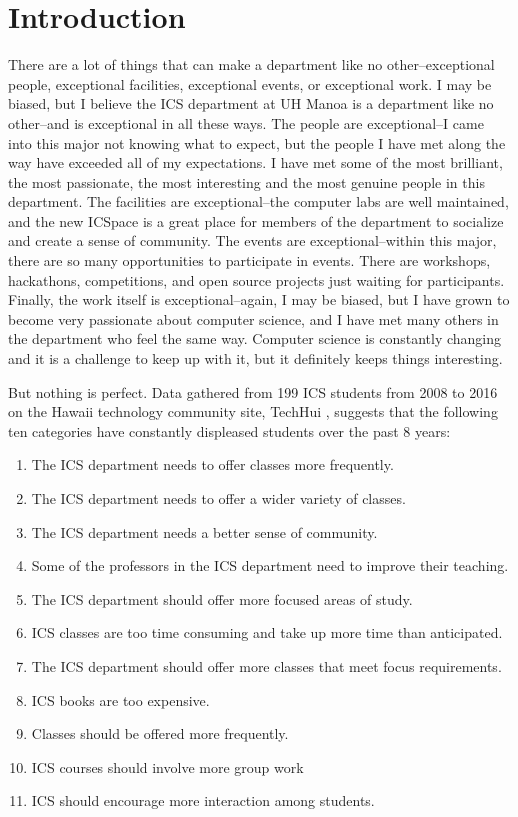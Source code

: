 \chapter{Introduction}
There are a lot of things that can make a department like no other--exceptional people, exceptional facilities, exceptional events, or exceptional work. I may be biased, but I believe the ICS department at UH Manoa is a department like no other--and is exceptional in all these ways. The people are exceptional--I came into this major not knowing what to expect, but the people I have met along the way have exceeded all of my expectations. I have met some of the most brilliant, the most passionate, the most interesting and the most genuine people in this department. The facilities are exceptional--the computer labs are well maintained, and the new ICSpace is a great place for members of the department to socialize and create a sense of community. The events are exceptional--within this major, there are so many opportunities to participate in events. There are workshops, hackathons, competitions, and open source projects just waiting for participants. Finally, the work itself is exceptional--again, I may be biased, but I have grown to become very passionate about computer science, and I have met many others in the department who feel the same way. Computer science is constantly changing and it is a challenge to keep up with it, but it definitely keeps things interesting.

But nothing is perfect. Data gathered from 199 ICS students from 2008 to 2016 on the Hawaii technology community site, TechHui \cite {TechHuiQuestions}, suggests that the following ten categories have constantly displeased students over the past 8 years:

\begin{enumerate}
  \item The ICS department needs to offer classes more frequently.
  \item The ICS department needs to offer a wider variety of classes.
  \item The ICS department needs a better sense of community.
  \item Some of the professors in the ICS department need to improve their teaching.
  \item The ICS department should offer more focused areas of study.
  \item ICS classes are too time consuming and take up more time than anticipated.
  \item The ICS department should offer more classes that meet focus requirements.
  \item ICS books are too expensive.
  \item Classes should be offered more frequently.
  \item ICS courses should involve more group work 
  \item ICS should encourage more interaction among students.
\end{enumerate}


